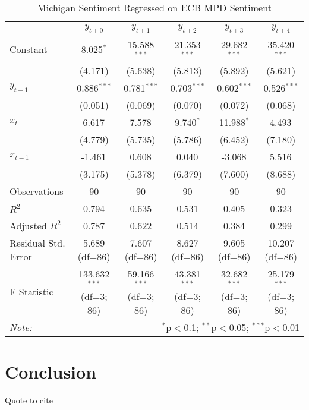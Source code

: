 \documentclass[12pt, letterpaper]{article}
\begin{document}
\begin{table}[H] 
    \centering
  \caption{Michigan Sentiment Regressed on ECB MPD Sentiment}
  \begin{adjustbox}{width=\textwidth}
  \begin{tabular}{lccccc}
  \hline
  \hline
   & $y_{t+0}$ & $y_{t+1}$ & $y_{t+2}$ & $y_{t+3}$ & $y_{t+4}$  \\
  \hline
   Constant & 8.025$^{*}$ & 15.588$^{***}$ & 21.353$^{***}$ & 29.682$^{***}$ & 35.420$^{***}$ \\
  & (4.171) & (5.638) & (5.813) & (5.892) & (5.621) \\
   $y_{t-1}$ & 0.886$^{***}$ & 0.781$^{***}$ & 0.703$^{***}$ & 0.602$^{***}$ & 0.526$^{***}$ \\
  & (0.051) & (0.069) & (0.070) & (0.072) & (0.068) \\
   $x_{t}$ & 6.617$^{}$ & 7.578$^{}$ & 9.740$^{*}$ & 11.988$^{*}$ & 4.493$^{}$ \\
  & (4.779) & (5.735) & (5.786) & (6.452) & (7.180) \\
   $x_{t-1}$ & -1.461$^{}$ & 0.608$^{}$ & 0.040$^{}$ & -3.068$^{}$ & 5.516$^{}$ \\
  & (3.175) & (5.378) & (6.379) & (7.600) & (8.688) \\
  \hline
   Observations & 90 & 90 & 90 & 90 & 90 \\
   $R^2$ & 0.794 & 0.635 & 0.531 & 0.405 & 0.323 \\
   Adjusted $R^2$ & 0.787 & 0.622 & 0.514 & 0.384 & 0.299 \\
   Residual Std. Error & 5.689 (df=86) & 7.607 (df=86) & 8.627 (df=86) & 9.605 (df=86) & 10.207 (df=86) \\
   F Statistic & 133.632$^{***}$ (df=3; 86) & 59.166$^{***}$ (df=3; 86) & 43.381$^{***}$ (df=3; 86) & 32.682$^{***}$ (df=3; 86) & 25.179$^{***}$ (df=3; 86) \\
  \hline
  \hline
  \textit{Note:} & \multicolumn{5}{r}{$^{*}$p$<$0.1; $^{**}$p$<$0.05; $^{***}$p$<$0.01} \\
  \end{tabular}
  \end{adjustbox}
  \end{table}

\section{Conclusion}

Quote to cite \cite{RePEc:ces:ceswps:_2134}
\end{document}
